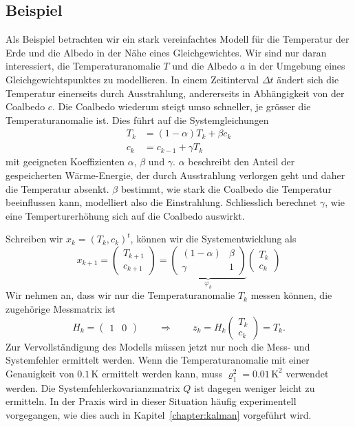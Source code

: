 \subsection{Beispiel}
Als Beispiel betrachten wir ein stark vereinfachtes Modell für die
Temperatur der Erde und die Albedo in der Nähe eines Gleichgewichtes.
Wir sind nur daran interessiert, die Temperaturanomalie $T$ und die
Albedo $a$ in der Umgebung eines Gleichgewichtspunktes zu
modellieren.
In einem Zeitinterval $\Delta t$ ändert sich die Temperatur
einerseits durch Ausstrahlung, andererseits in Abhängigkeit von
der Coalbedo $c$. 
Die Coalbedo wiederum steigt umso schneller, je grösser die
Temperaturanomalie ist.
Dies führt auf die Systemgleichungen
\[
\begin{aligned}
T_k &= (1-\alpha) T_k  + \beta c_k \\
c_k &= c_{k-1} + \gamma T_k
\end{aligned}
\]
mit geeigneten Koeffizienten $\alpha$, $\beta$ und $\gamma$.
$\alpha$ beschreibt den Anteil der gespeicherten Wärme-Energie, der durch
Ausstrahlung verlorgen geht und daher die Temperatur absenkt.
$\beta$ bestimmt, wie stark die Coalbedo die Temperatur beeinflussen kann,
modelliert also die Einstrahlung.
Schliesslich berechnet $\gamma$, wie eine Temperturerhöhung sich auf die
Coalbedo auswirkt.

Schreiben wir $x_k=(T_k,c_k)^t$, können wir die Systementwicklung als
\[
x_{k+1}
=
\begin{pmatrix}
T_{k+1}\\c_{k+1}
\end{pmatrix}
=
\underbrace{
\begin{pmatrix}
(1-\alpha)&\beta\\
\gamma& 1
\end{pmatrix}}_{\displaystyle\varphi_k}
\begin{pmatrix}
T_k\\c_k
\end{pmatrix}
\]
Wir nehmen an, dass wir nur die Temperaturanomalie $T_k$ messen können,
die zugehörige Messmatrix ist
\[
H_k=\begin{pmatrix}1&0\end{pmatrix}
\qquad\Rightarrow\qquad
z_k = H_k\begin{pmatrix} T_k\\c_k\end{pmatrix}
=
T_k.
\]
Zur Vervollständigung des Modells müssen jetzt nur noch die Mess- und
Systemfehler ermittelt werden.
Wenn die Temperaturanomalie mit einer Genauigkeit von $0.1\,\text{K}$
ermittelt werden kann, muss $\varrho_1^2=0.01\,\text{K}^2$ verwendet
werden.
Die Systemfehlerkovarianzmatrix $Q$ ist dagegen weniger leicht zu ermitteln.
In der Praxis wird in dieser Situation häufig experimentell vorgegangen,
wie dies auch in Kapitel~\ref{chapter:kalman} vorgeführt wird.






